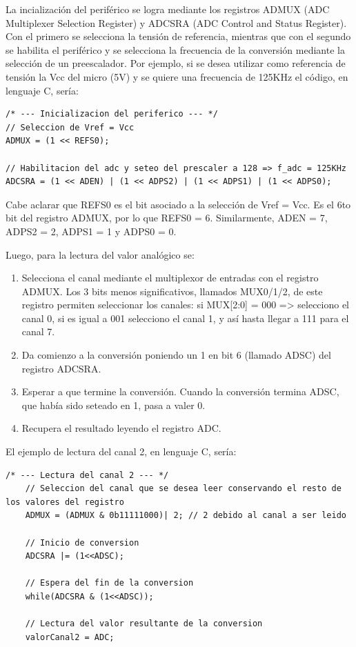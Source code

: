 La incialización del periférico se logra mediante los registros ADMUX (ADC Multiplexer Selection Register) y ADCSRA (ADC Control and Status Register). Con el primero se selecciona la tensión de referencia, mientras que con el segundo se habilita el periférico y se selecciona la frecuencia de la conversión mediante la selección de un preescalador. Por ejemplo, si se desea utilizar como referencia de tensión la Vcc del micro (5V) y se quiere una frecuencia de 125KHz el código, en lenguaje C, sería:
\begin{lstlisting}[style=CStyle]
/* --- Inicializacion del periferico --- */
// Seleccion de Vref = Vcc
ADMUX = (1 << REFS0);

// Habilitacion del adc y seteo del prescaler a 128 => f_adc = 125KHz
ADCSRA = (1 << ADEN) | (1 << ADPS2) | (1 << ADPS1) | (1 << ADPS0); 
\end{lstlisting}
Cabe aclarar que REFS0 es el bit asociado a la selección de Vref = Vcc. Es el 6to bit del registro ADMUX, por lo que REFS0 = 6. Similarmente, ADEN = 7, ADPS2 = 2, ADPS1 = 1 y ADPS0 = 0.

Luego, para la lectura del valor analógico se:
\begin{enumerate}
	\item Selecciona el canal mediante el multiplexor de entradas con el registro ADMUX. Los 3 bits menos significativos, llamados MUX0/1/2, de este registro permiten seleccionar los canales: si MUX[2:0] = 000 => selecciono el canal 0, si es igual a 001 selecciono el canal 1, y así hasta llegar a 111 para el canal 7.

	\item Da comienzo a la conversión poniendo un 1 en bit 6 (llamado ADSC) del registro ADCSRA.
	\item Esperar a que termine la conversión. Cuando la conversión termina ADSC, que había sido seteado en 1, pasa a valer 0.
	\item Recupera el resultado leyendo el registro ADC.
\end{enumerate}

El ejemplo de lectura del canal 2, en lenguaje C, sería:
\begin{lstlisting}[style=CStyle]
	/* --- Lectura del canal 2 --- */
	// Seleccion del canal que se desea leer conservando el resto de los valores del registro
	ADMUX = (ADMUX & 0b11111000)| 2; // 2 debido al canal a ser leido
	
	// Inicio de conversion
	ADCSRA |= (1<<ADSC);
	
	// Espera del fin de la conversion
	while(ADCSRA & (1<<ADSC));
	
	// Lectura del valor resultante de la conversion
	valorCanal2 = ADC;
\end{lstlisting}

